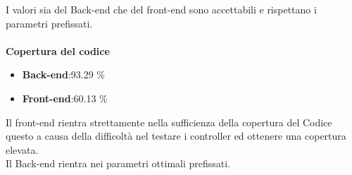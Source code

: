 I valori sia del Back-end che del front-end sono accettabili e rispettano i parametri prefissati.
\\\\
\textbf{Copertura del codice}
\begin{itemize}
\item \textbf{Back-end}:93.29 \%
\item \textbf{Front-end}:60.13 \%
\end{itemize}
Il front-end rientra strettamente nella sufficienza della copertura del Codice questo a causa della difficoltà nel testare i controller ed ottenere una copertura elevata.\\
Il Back-end rientra nei parametri ottimali prefissati.